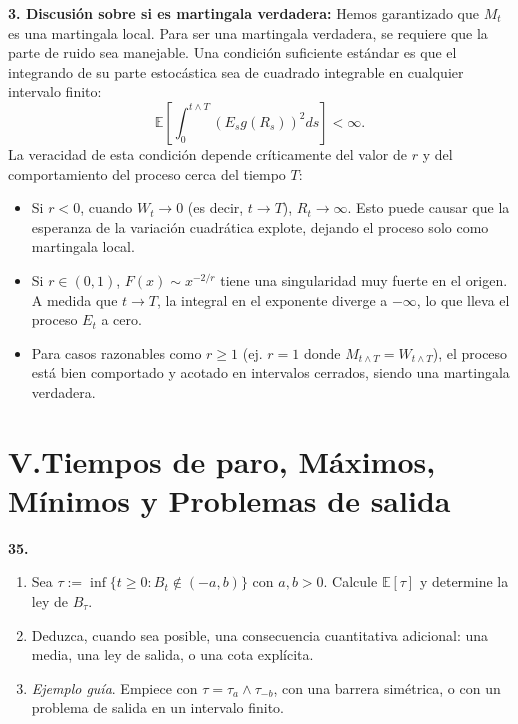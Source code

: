 \documentclass[11pt, letterpaper]{article}
\begin{document}
\begin{solucion}
    \textbf{3. Discusión sobre si es martingala verdadera:}
    Hemos garantizado que $M_t$ es una martingala local. Para ser una martingala verdadera, se requiere que la parte de ruido sea manejable. Una condición suficiente estándar es que el integrando de su parte estocástica sea de cuadrado integrable en cualquier intervalo finito:
    \[ \mathbb{E}\left[ \int_0^{t \wedge T} \left( E_s g(R_s) \right)^2 ds \right] < \infty. \]
    La veracidad de esta condición depende críticamente del valor de $r$ y del comportamiento del proceso cerca del tiempo $T$:
    \begin{itemize}
        \item Si $r < 0$, cuando $W_t \to 0$ (es decir, $t \to T$), $R_t \to \infty$. Esto puede causar que la esperanza de la variación cuadrática explote, dejando el proceso solo como martingala local.
        \item Si $r \in (0, 1)$, $F(x) \sim x^{-2/r}$ tiene una singularidad muy fuerte en el origen. A medida que $t \to T$, la integral en el exponente diverge a $-\infty$, lo que lleva el proceso $E_t$ a cero. 
        \item Para casos razonables como $r \ge 1$ (ej. $r=1$ donde $M_{t \wedge T} = W_{t \wedge T}$), el proceso está bien comportado y acotado en intervalos cerrados, siendo una martingala verdadera.
    \end{itemize}
\end{solucion}

\newpage


\section{V.Tiempos de paro, Máximos, Mínimos y Problemas de salida}

\vspace{3mm}

\begin{ejercicio}
    \textbf{35.} 
    \begin{enumerate}
        \item Sea $\tau := \inf\{t \ge 0 : B_t \notin (-a, b)\}$ con $a, b > 0$. Calcule $\mathbb{E}[\tau]$ y determine la ley de $B_\tau$.
        \item Deduzca, cuando sea posible, una consecuencia cuantitativa adicional: una media, una ley de salida, o una cota explícita.
        \item \textit{Ejemplo guía}. Empiece con $\tau = \tau_a \wedge \tau_{-b}$, con una barrera simétrica, o con un problema de salida en un intervalo finito.
    \end{enumerate}
\end{ejercicio}
\end{document}
